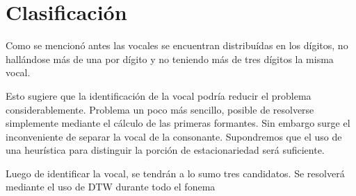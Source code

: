 \documentclass[a4paper]{article}
\begin{document}
	\section{Clasificación}
		Como se mencionó antes las vocales se encuentran distribuídas en los dígitos, no hallándose más de una por dígito
		y no teniendo más de tres dígitos la misma vocal.

		Esto sugiere que la identificación de la vocal podría reducir el problema considerablemente. 
		Problema un poco más sencillo, posible de resolverse simplemente mediante el cálculo de las primeras formantes.
		Sin embargo surge el inconveniente de separar la vocal de la consonante. 
		Supondremos que el uso de una heurística para distinguir la porción de estacionariedad será suficiente.

		Luego de identificar la vocal, se tendrán a lo sumo tres candidatos. 
		Se resolverá mediante el uso de DTW durante todo el fonema

		
	
\end{document}
